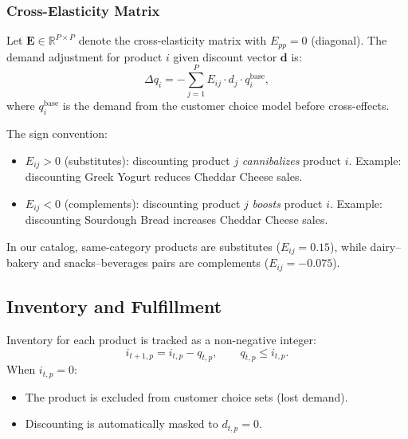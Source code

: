 \documentclass[11pt,a4paper]{article}
\begin{document}
\subsubsection{Cross-Elasticity Matrix}

Let $\mathbf{E} \in \mathbb{R}^{P \times P}$ denote the cross-elasticity matrix with $E_{pp} = 0$ (diagonal).
The demand adjustment for product $i$ given discount vector $\mathbf{d}$ is:
\begin{equation}
\Delta q_i = -\sum_{j=1}^{P} E_{ij} \cdot d_j \cdot q_i^{\text{base}},
\end{equation}
where $q_i^{\text{base}}$ is the demand from the customer choice model before cross-effects.

The sign convention:
\begin{itemize}
    \item $E_{ij} > 0$ (substitutes): discounting product $j$ \emph{cannibalizes} product $i$. Example: discounting Greek Yogurt reduces Cheddar Cheese sales.
    \item $E_{ij} < 0$ (complements): discounting product $j$ \emph{boosts} product $i$. Example: discounting Sourdough Bread increases Cheddar Cheese sales.
\end{itemize}

In our catalog, same-category products are substitutes ($E_{ij} = 0.15$), while dairy--bakery and snacks--beverages pairs are complements ($E_{ij} = -0.075$).

\subsection{Inventory and Fulfillment}

Inventory for each product is tracked as a non-negative integer:
\begin{equation}
i_{t+1, p} = i_{t, p} - q_{t, p}, \qquad q_{t, p} \leq i_{t, p}.
\end{equation}
When $i_{t,p} = 0$:
\begin{itemize}
    \item The product is excluded from customer choice sets (lost demand).
    \item Discounting is automatically masked to $d_{t,p} = 0$.
\end{itemize}

\end{document}
